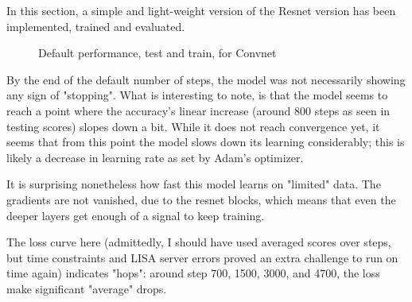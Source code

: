 In this section, a simple and light-weight version of the Resnet version has been implemented, trained and evaluated.
\begin{figure}%
    \centering
    \qquad
    \caption{Default performance, test and train, for Convnet}%
    \label{fig:defaults}%
\end{figure}

By the end of the default number of steps, the model was not necessarily showing any sign of "stopping". 
What is interesting to note, is that the model seems to reach a point where the accuracy's linear increase (around 800 steps as seen in testing scores)
slopes down a bit. While it does not reach convergence yet, it seems that from this point the model slows down
its learning considerably; this is likely a decrease in learning rate as set by Adam's optimizer.

It is surprising nonetheless how fast this model learns on "limited" data. The gradients are not vanished,
due to the resnet blocks, which means that even the deeper layers get enough of a signal to keep training.

The loss curve here (admittedly, I should have used averaged scores over steps, but time constraints and LISA server errors proved an extra challenge to run on time again)
indicates "hops": around step 700, 1500, 3000, and 4700, the loss make significant "average" drops.